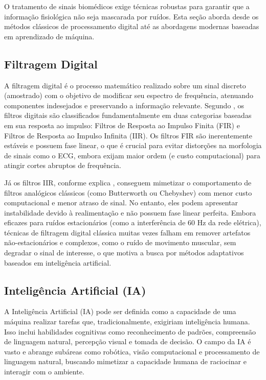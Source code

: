 \documentclass[tcc,capa]{texufpel}
\begin{document}
O tratamento de sinais biomédicos exige técnicas robustas para garantir que a informação fisiológica não seja mascarada por ruídos. Esta seção aborda desde os métodos clássicos de processamento digital até as abordagens modernas baseadas em aprendizado de máquina.

\subsection{Filtragem Digital}

A filtragem digital é o processo matemático realizado sobre um sinal discreto (amostrado) com o objetivo de modificar seu espectro de frequência, atenuando componentes indesejados e preservando a informação relevante. Segundo \citet{balbinot2019v1}, os filtros digitais são classificados fundamentalmente em duas categorias baseadas em sua resposta ao impulso: Filtros de Resposta ao Impulso Finita (FIR) e Filtros de Resposta ao Impulso Infinita (IIR). Os filtros FIR são inerentemente estáveis e possuem fase linear, o que é crucial para evitar distorções na morfologia de sinais como o ECG, embora exijam maior ordem (e custo computacional) para atingir cortes abruptos de frequência.

Já os filtros IIR, conforme explica \cite{balbinot2019v1}, conseguem mimetizar o comportamento de filtros analógicos clássicos (como Butterworth ou Chebyshev) com menor custo computacional e menor atraso de sinal. No entanto, eles podem apresentar instabilidade devido à realimentação e não possuem fase linear perfeita. Embora eficazes para ruídos estacionários (como a interferência de 60 Hz da rede elétrica), técnicas de filtragem digital clássica muitas vezes falham em remover artefatos não-estacionários e complexos, como o ruído de movimento muscular, sem degradar o sinal de interesse, o que motiva a busca por métodos adaptativos baseados em inteligência artificial.

\subsection{Inteligência Artificial (IA)}

A Inteligência Artificial (IA) pode ser definida como a capacidade de uma máquina realizar tarefas que, tradicionalmente, exigiriam inteligência humana. Isso inclui habilidades cognitivas como reconhecimento de padrões, compreensão de linguagem natural, percepção visual e tomada de decisão. O campo da IA é vasto e abrange subáreas como robótica, visão computacional e processamento de linguagem natural, buscando mimetizar a capacidade humana de raciocinar e interagir com o ambiente.
\end{document}
